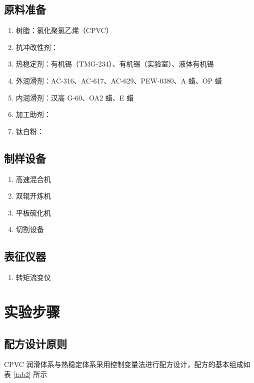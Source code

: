 \documentclass[a4paper, oneside, onecolumn, 12pt]{ctexrep}    %
\begin{document}
\section{原料准备}
\begin{enumerate}[(1) ]
    \item 树脂：氯化聚氯乙烯（CPVC）
    \item 抗冲改性剂：
    \item 热稳定剂：有机锡（TMG-234）、有机锡（实验室）、液体有机锡
    \item 外润滑剂：AC-316、AC-617、AC-629、PEW-0380、A 蜡、OP 蜡
    \item 内润滑剂：汉高 G-60、OA2 蜡、E 蜡
    \item 加工助剂：
    \item 钛白粉：
\end{enumerate}

\section{制样设备}
\begin{enumerate}[(1) ]
    \item 高速混合机
    \item 双辊开炼机
    \item 平板硫化机
    \item 切割设备
\end{enumerate}

\section{表征仪器}
\begin{enumerate}
    \item 转矩流变仪
\end{enumerate}

\chapter{实验步骤}

\section{配方设计原则}
CPVC 润滑体系与热稳定体系采用控制变量法进行配方设计，配方的基本组成如表 \ref{tab2} 所示
\end{document}

